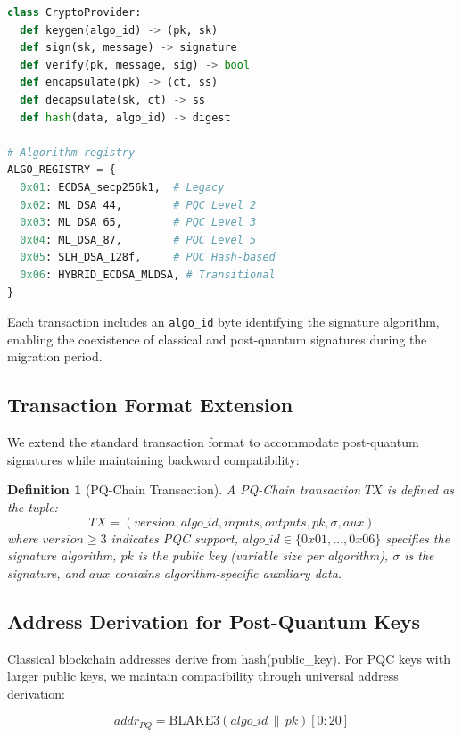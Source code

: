 \documentclass[12pt, a4paper, twocolumn]{article}
\newtheorem{definition}{Definition}
\begin{document}
\begin{lstlisting}[language=Python, caption={CAL Interface (Pseudocode)}]
class CryptoProvider:
  def keygen(algo_id) -> (pk, sk)
  def sign(sk, message) -> signature
  def verify(pk, message, sig) -> bool
  def encapsulate(pk) -> (ct, ss)
  def decapsulate(sk, ct) -> ss
  def hash(data, algo_id) -> digest

# Algorithm registry
ALGO_REGISTRY = {
  0x01: ECDSA_secp256k1,  # Legacy
  0x02: ML_DSA_44,        # PQC Level 2
  0x03: ML_DSA_65,        # PQC Level 3
  0x04: ML_DSA_87,        # PQC Level 5
  0x05: SLH_DSA_128f,     # PQC Hash-based
  0x06: HYBRID_ECDSA_MLDSA, # Transitional
}
\end{lstlisting}

Each transaction includes an \texttt{algo\_id} byte identifying the signature algorithm, enabling the coexistence of classical and post-quantum signatures during the migration period.

\subsection{Transaction Format Extension}

We extend the standard transaction format to accommodate post-quantum signatures while maintaining backward compatibility:

\begin{definition}[PQ-Chain Transaction]
A PQ-Chain transaction $\mathit{TX}$ is defined as the tuple:
\[
\mathit{TX} = (\mathit{version}, \mathit{algo\_id}, \mathit{inputs}, \mathit{outputs}, \mathit{pk}, \sigma, \mathit{aux})
\]
where $\mathit{version} \geq 3$ indicates PQC support, $\mathit{algo\_id} \in \{0x01, \ldots, 0x06\}$ specifies the signature algorithm, $\mathit{pk}$ is the public key (variable size per algorithm), $\sigma$ is the signature, and $\mathit{aux}$ contains algorithm-specific auxiliary data.
\end{definition}

\subsection{Address Derivation for Post-Quantum Keys}

Classical blockchain addresses derive from hash(public\_key). For PQC keys with larger public keys, we maintain compatibility through universal address derivation:

\[
\mathit{addr}_{PQ} = \text{BLAKE3}(\mathit{algo\_id} \,\|\, \mathit{pk})[0:20]
\]
\end{document}
